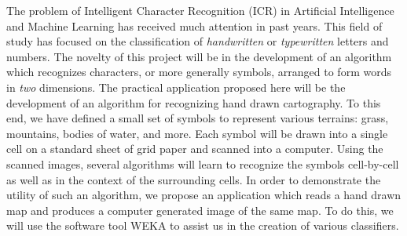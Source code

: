 
The problem of Intelligent Character Recognition (ICR) in Artificial
Intelligence and Machine Learning has received much attention in past years.
This field of study has focused on the classification of \emph{handwritten}  or
\emph{typewritten} letters and numbers.  The novelty of this project will be in
the development of an algorithm which recognizes characters, or more generally
symbols, arranged to form words in \emph{two} dimensions. The practical
application proposed here will be the development of an algorithm for
recognizing hand drawn cartography. To this end, we have defined a small set of
symbols to represent various terrains: grass, mountains, bodies of water, and
more. Each symbol will be drawn into a single cell on a standard sheet of grid
paper and scanned into a computer. Using the scanned images, several
algorithms will learn to recognize the symbols cell-by-cell as well as in the
context of the surrounding cells. In order to demonstrate
the utility of such an algorithm, we propose an application which reads a
hand drawn map and produces a computer generated image of the same map. To do this,
we will use the software tool WEKA\cite{hall2009} to assist us in the creation
of various classifiers.

